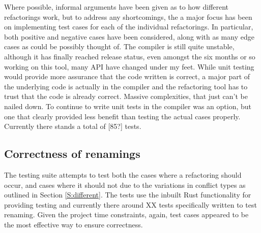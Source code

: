 Where possible, informal arguments have been given as to how different refactorings work, but to address any shortcomings, the a major focus has been on implementing test cases for each of the individual refactorings. In particular, both positive and negative cases have been considered, along with as many edge cases as could be possibly thought of. The compiler is still quite unstable, although it has finally reached release status, even amongst the six months or so working on this tool, many API have changed under my feet. While unit testing would provide more assurance that the code written is correct, a major part of the underlying code is actually in the compiler and the refactoring tool has to trust that the code is already correct. Massive complexities, that just can't be nailed down. To continue to write unit tests in the compiler was an option, but one that clearly provided less benefit than testing the actual cases properly. Currently there stands a total of [85?] tests.




\subsection{Correctness of renamings}
The testing suite attempts to test both the cases where a refactoring should occur, and cases where it should not due to the variations in conflict types as outlined in Section \ref{S:different}. The tests use the inbuilt Rust functionality for providing testing and currently there around XX tests specifically written to test renaming. Given the project time constraints, again, test cases appeared to be the most effective way to ensure correctness.


